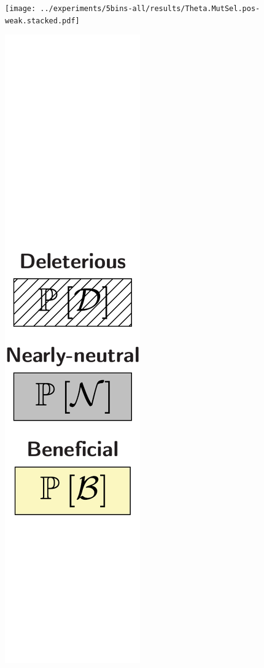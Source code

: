 \documentclass{article}
\begin{document}
\begin{center}
\begin{minipage}{0.09\linewidth}
        \end{minipage}
        \begin{minipage}{0.9\linewidth}
            \texttt{[image: ../experiments/5bins-all/results/Theta.MutSel.pos-weak.stacked.pdf]} \\
        \end{minipage}
        \begin{minipage}{0.09\linewidth}
            \includegraphics[width=\linewidth, page=1]{artworks/legend.polycat}

\end{minipage}
\end{center}
\end{document}
